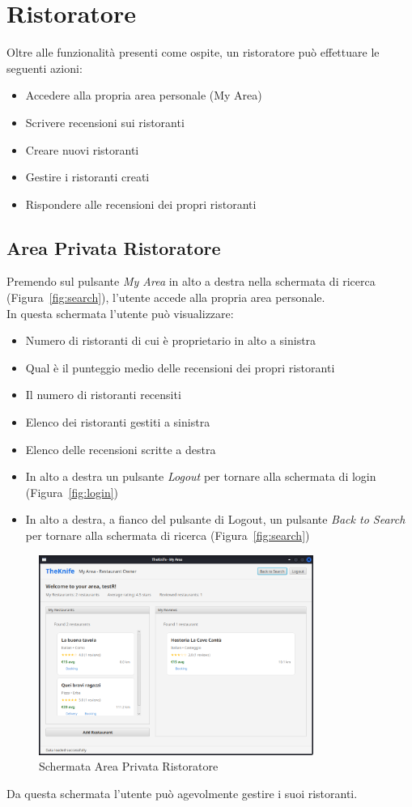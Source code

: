 \section{Ristoratore}
Oltre alle funzionalità presenti come ospite, un ristoratore può effettuare 
le seguenti azioni:
\begin{itemize}
    \item Accedere alla propria area personale (My Area)
    \item Scrivere recensioni sui ristoranti
    \item Creare nuovi ristoranti
    \item Gestire i ristoranti creati
    \item Rispondere alle recensioni dei propri ristoranti
\end{itemize}

\subsection{Area Privata Ristoratore}
Premendo sul pulsante \emph{My Area} in alto a destra nella schermata 
di ricerca (Figura~\ref{fig:search}), l'utente accede alla propria area personale.\\
In questa schermata l'utente può visualizzare:
\begin{itemize}
    \item Numero di ristoranti di cui è proprietario in alto a sinistra
    \item Qual è il punteggio medio delle recensioni dei propri ristoranti
    \item Il numero di ristoranti recensiti
    \item Elenco dei ristoranti gestiti a sinistra
    \item Elenco delle recensioni scritte a destra
    \item In alto a destra un pulsante \emph{Logout} per tornare alla schermata di login (Figura~\ref{fig:login})
    \item In alto a destra, a fianco del pulsante di Logout, 
    un pulsante \emph{Back to Search} per tornare alla 
    schermata di ricerca (Figura~\ref{fig:search})
\end{itemize}
\begin{figure}[H]
    \centering
    \includegraphics[width=0.8\textwidth]{images/myarea-owner.png}
    \caption{Schermata Area Privata Ristoratore}
    \label{fig:myarea-owner}
\end{figure}
Da questa schermata l'utente può agevolmente gestire i suoi ristoranti.
